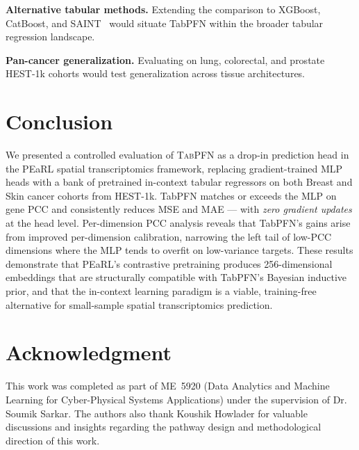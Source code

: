 \documentclass[conference]{IEEEtran}
\begin{document}
\textbf{Alternative tabular methods.}
Extending the comparison to XGBoost, CatBoost, and SAINT~\cite{saint2021}
would situate TabPFN within the broader tabular regression landscape.

\textbf{Pan-cancer generalization.}
Evaluating on lung, colorectal, and prostate HEST-1k cohorts would test
generalization across tissue architectures.

\section{Conclusion}
\label{sec:conclusion}

We presented a controlled evaluation of \textsc{TabPFN} as a drop-in
prediction head in the PEaRL spatial transcriptomics framework, replacing
gradient-trained MLP heads with a bank of pretrained in-context tabular
regressors on both Breast and Skin cancer cohorts from HEST-1k.
TabPFN matches or exceeds the MLP on gene PCC and consistently reduces MSE
and MAE --- with \emph{zero gradient updates} at the head level.
Per-dimension PCC analysis reveals that TabPFN's gains arise from improved
per-dimension calibration, narrowing the left tail of low-PCC dimensions
where the MLP tends to overfit on low-variance targets.
These results demonstrate that PEaRL's contrastive pretraining produces
256-dimensional embeddings that are structurally compatible with TabPFN's
Bayesian inductive prior, and that the in-context learning paradigm is a
viable, training-free alternative for small-sample spatial transcriptomics
prediction.

\section*{Acknowledgment}

This work was completed as part of ME~5920 (Data Analytics and Machine Learning for Cyber-Physical Systems Applications) under the supervision of Dr. Soumik Sarkar. The authors also thank Koushik Howlader for valuable discussions and insights regarding the pathway design and methodological direction of this work.
\end{document}
